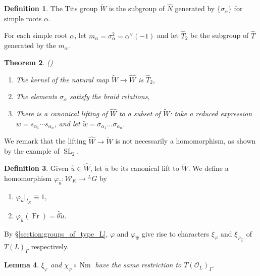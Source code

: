 \documentclass{amsart}
\theoremstyle{plain}
\newtheorem{theorem}{Theorem}[section]
\newtheorem{lemma}[theorem]{Lemma}
\theoremstyle{definition}
\newtheorem{definition}[theorem]{Definition}
\numberwithin{equation}{section}
\DeclareMathOperator{\Nm}{Nm}
\DeclareMathOperator{\Fr}{Fr}
\DeclareMathOperator{\SL}{SL}
\newcommand{\OL}{\mathcal{O}_L}
\newcommand{\Weil}{\mathcal{W}}
\begin{document}
\begin{definition}
  The Tits group $\widetilde{W}$ is the subgroup of $\hat{N}$
  generated by $\{\sigma_{\alpha} \}$ for simple roots $\alpha$.
\end{definition}

For each simple root $\alpha$, let $m_{\alpha} = \sigma_{\alpha}^2 = \alpha^{\vee}(-1)$ and
let $\hat{T}_2$ be the subgroup of $\hat{T}$ generated by the $m_{\alpha}$.

\begin{theorem}{(\cite{tits:66a})}
\begin{enumerate}

\item The kernel of the natural map $\widetilde{W} \rightarrow \hat{W}$
  is $\hat{T}_2$,
\item The elements $\sigma_{\alpha}$ satisfy the braid relations,
\item There is a canonical lifting of $\hat{W}$ to a subset of
  $\widetilde{W}$: take a reduced expression $w = s_{\alpha_1} \cdots s_{\alpha_n}$,
  and let $\tilde{w} = \sigma_{\alpha_1} ... \sigma_{\alpha_n}$.
\end{enumerate}
\end{theorem}

We remark that the lifting $\hat{W} \rightarrow \widetilde{W}$ is not necessarily a homomorphism,
as shown by the example of $\SL_2$.

\begin{definition} \label{def:phiu}
Given $\hat{u} \in \hat{W}$, let $\tilde{u}$ be its canonical lift to $\widetilde{W}$.
We define a homomorphism $\varphi_{\hat{u}} : \Weil_K \rightarrow {}^L G$ by
\begin{enumerate}
\item $\varphi_{\hat{u}}|_{I_K} \equiv 1$,
\item $\varphi_{\hat{u}}(\Fr) = \hat{\theta} \tilde{u}$.
\end{enumerate}
\end{definition}

By
\S\ref{section:groups_of_type_L}, $\varphi$ and $\varphi_{\hat{w}}$ give rise to characters
$\xi_{\varphi}$ and $\xi_{\varphi_{\hat{w}}}$ of $T(L)_{\Gamma}$ respectively.

\begin{lemma} \label{lem:GDR_compat}
$\xi_{\varphi}$ and $\chi_{\varphi} \circ \Nm$ have the same restriction to $T(\OL)_{\Gamma}$.
\end{lemma}
\end{document}
